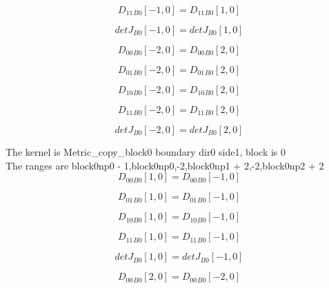 \documentclass{article}
\begin{document}
\begin{dmath}{D_{11}{_{B0}}}[{-1,0}] = {D_{11}{_{B0}}}[{1,0}]\end{dmath}

\begin{dmath}{detJ{_{B0}}}[{-1,0}] = {detJ{_{B0}}}[{1,0}]\end{dmath}

\begin{dmath}{D_{00}{_{B0}}}[{-2,0}] = {D_{00}{_{B0}}}[{2,0}]\end{dmath}

\begin{dmath}{D_{01}{_{B0}}}[{-2,0}] = {D_{01}{_{B0}}}[{2,0}]\end{dmath}

\begin{dmath}{D_{10}{_{B0}}}[{-2,0}] = {D_{10}{_{B0}}}[{2,0}]\end{dmath}

\begin{dmath}{D_{11}{_{B0}}}[{-2,0}] = {D_{11}{_{B0}}}[{2,0}]\end{dmath}

\begin{dmath}{detJ{_{B0}}}[{-2,0}] = {detJ{_{B0}}}[{2,0}]\end{dmath}

\noindent The kernel is Metric_copy_block0 boundary dir0 side1, block is 0\\\noindent The ranges are block0np0 - 1,block0np0,-2,block0np1 + 2,-2,block0np2 + 2\\\begin{dmath}{D_{00}{_{B0}}}[{1,0}] = {D_{00}{_{B0}}}[{-1,0}]\end{dmath}

\begin{dmath}{D_{01}{_{B0}}}[{1,0}] = {D_{01}{_{B0}}}[{-1,0}]\end{dmath}

\begin{dmath}{D_{10}{_{B0}}}[{1,0}] = {D_{10}{_{B0}}}[{-1,0}]\end{dmath}

\begin{dmath}{D_{11}{_{B0}}}[{1,0}] = {D_{11}{_{B0}}}[{-1,0}]\end{dmath}

\begin{dmath}{detJ{_{B0}}}[{1,0}] = {detJ{_{B0}}}[{-1,0}]\end{dmath}

\begin{dmath}{D_{00}{_{B0}}}[{2,0}] = {D_{00}{_{B0}}}[{-2,0}]\end{dmath}
\end{document}
